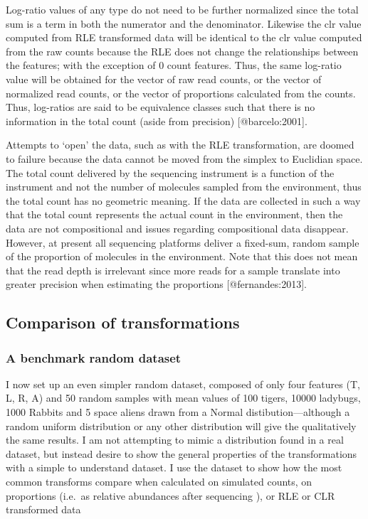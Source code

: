 \documentclass[
  onecolumn]{article}
\begin{document}
Log-ratio values of any type do not need to be further normalized since the total sum is a term in both the numerator and the denominator. Likewise the clr value computed from RLE transformed data will be identical to the clr value computed from the raw counts because the RLE does not change the relationships between the features; with the exception of 0 count features. Thus, the same log-ratio value will be obtained for the vector of raw read counts, or the vector of normalized read counts, or the vector of proportions calculated from the counts. Thus, log-ratios are said to be equivalence classes such that there is no information in the total count (aside from precision) {[}@barcelo:2001{]}.

Attempts to `open' the data, such as with the RLE transformation, are doomed to failure because the data cannot be moved from the simplex to Euclidian space. The total count delivered by the sequencing instrument is a function of the instrument and not the number of molecules sampled from the environment, thus the total count has no geometric meaning. If the data are collected in such a way that the total count represents the actual count in the environment, then the data are not compositional and issues regarding compositional data disappear. However, at present all sequencing platforms deliver a fixed-sum, random sample of the proportion of molecules in the environment. Note that this does not mean that the read depth is irrelevant since more reads for a sample translate into greater precision when estimating the proportions {[}@fernandes:2013{]}.

\hypertarget{comparison-of-transformations}{%
\subsection{Comparison of transformations}\label{comparison-of-transformations}}

\hypertarget{a-benchmark-random-dataset}{%
\subsubsection{A benchmark random dataset}\label{a-benchmark-random-dataset}}

I now set up an even simpler random dataset, composed of only four features (T, L, R, A) and 50 random samples with mean values of 100 tigers, 10000 ladybugs, 1000 Rabbits and 5 space aliens drawn from a Normal distibution---although a random uniform distribution or any other distribution will give the qualitatively the same results. I am not attempting to mimic a distribution found in a real dataset, but instead desire to show the general properties of the transformations with a simple to understand dataset. I use the dataset to show how the most common transforms compare when calculated on simulated counts, on proportions (i.e.~as relative abundances after sequencing
), or RLE or CLR transformed data
\end{document}

